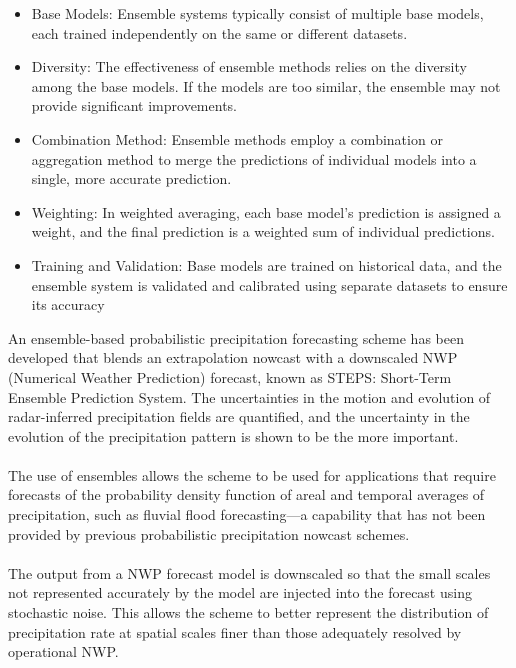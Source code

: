 \documentclass[../paper.tex]{subfiles}
\begin{document}
    \begin{itemize}
        \item Base Models: Ensemble systems typically consist of multiple base models,
        each trained independently on the same or different datasets.

        \item Diversity: The effectiveness of ensemble methods relies on the diversity among the base models.
        If the models are too similar, the ensemble may not provide significant improvements.

        \item Combination Method:
        Ensemble methods employ a combination or aggregation method
        to merge the predictions of individual models into a single,
        more accurate prediction.

        \item Weighting: In weighted averaging, each base model's prediction is assigned a weight,
        and the final prediction is a weighted sum of individual predictions.

        \item Training and Validation: Base models are trained on historical data,
        and the ensemble system is validated and calibrated
        using separate datasets to ensure its accuracy
    \end{itemize}

    An ensemble-based probabilistic precipitation forecasting scheme has been developed that blends an extrapolation nowcast with a downscaled NWP
    (Numerical Weather Prediction) forecast,
    known as STEPS: Short-Term Ensemble Prediction System.
    The uncertainties in the motion and evolution of radar-inferred precipitation fields are quantified,
    and the uncertainty in the evolution of the precipitation pattern is shown to be the more important. \\\\
    The use of ensembles allows the scheme
    to be used for applications
    that require forecasts of the probability density function of areal and temporal averages of precipitation,
    such as fluvial flood forecasting—a capability
    that has not been provided by previous probabilistic precipitation nowcast schemes. \\\\
    The output from a NWP forecast model is downscaled
    so that the small scales not represented accurately by the model are injected into the forecast
    using stochastic noise.
    This allows the scheme
    to better represent the distribution of precipitation rate at spatial scales finer than those
    adequately resolved by operational NWP\@.
    \\
\end{document}
